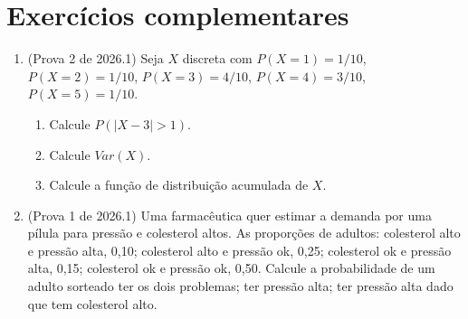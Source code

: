 \documentclass[11pt]{article}
\begin{document}
\bigskip
\section*{Exercícios complementares}

\begin{enumerate}[label=\textbf{C\arabic*.}, leftmargin=*]
\item (Prova 2 de 2026.1) Seja $X$ discreta com $P(X = 1) = 1/10$, $P(X = 2) = 1/10$, $P(X = 3) = 4/10$, $P(X = 4) = 3/10$, $P(X = 5) = 1/10$.
\begin{enumerate}[label=(\alph*)]
  \item Calcule $P(|X - 3| > 1)$.
  \item Calcule $Var(X)$.
  \item Calcule a função de distribuição acumulada de $X$.
\end{enumerate}
\item (Prova 1 de 2026.1) Uma farmacêutica quer estimar a demanda por uma pílula para pressão e colesterol altos. As proporções de adultos: colesterol alto e pressão alta, 0,10; colesterol alto e pressão ok, 0,25; colesterol ok e pressão alta, 0,15; colesterol ok e pressão ok, 0,50. Calcule a probabilidade de um adulto sorteado ter os dois problemas; ter pressão alta; ter pressão alta dado que tem colesterol alto.

\end{enumerate}
\end{document}
